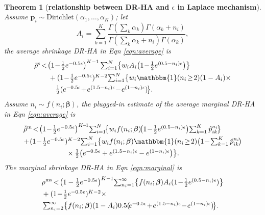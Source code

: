 \documentclass[10pt,journal,compsoc]{IEEEtran}
\newtheorem{thm}{\vspace{-6pt}\\ Theorem}
\newcommand{\p}{\mathbf{p}}
\newcommand{\bs}{\boldsymbol}
\begin{document}
\begin{thm}[\textbf{relationship between DR-HA and $\epsilon$ in Laplace mechanism}]
Assume $\p_i\!\sim\!\mbox{Dirichlet}(\alpha_1,\ldots,\alpha_K)$; let $$\mbox{$A_i=\sum_{k=1}^{K}\frac{\Gamma(\sum_k\alpha_k)\Gamma(\alpha_{k}+n_i)}{\Gamma(\sum_k\alpha_k+n_i)\Gamma(\alpha_{k})}$},$$ 
the average shrinkage DR-HA  in Eqn \eqref{eqn:average} is
\begin{align}
&\textstyle \bar{\rho}^{\text{s}}\!<\!\left(1\!-\!\frac{1}{2}e^{-0.5\epsilon}\right)^{K-1}\sum_{i=1}^{N}\!\big\{w_iA_i\big(1\!-\!\frac{1}{2}e^{(0.5-n_i)\epsilon}\big)\big\}\notag\\
&\qquad\textstyle + (1\!-\!\frac{1}{2}e^{-0.5\epsilon})^{K-2}\!\sum_{i=1}^{N}\!\big\{w_i\mathbbm{1}(n_i\!\ge\!2)(1-A_i)\times\label{eqn:averages.lap.K} \\
&\qquad\quad\textstyle\frac{1}{2}(e^{-0.5\epsilon}\!+\!e^{(1.5-n_i)\epsilon}\!-\!e^{(1-n_i)\epsilon})\!\big\}.  \notag
\end{align}
Assume $n_i\sim f(n_i;\bs{\beta})$, the plugged-in estimate of the average marginal DR-HA  in Eqn  \eqref{eqn:average} is
\begin{align}
&\textstyle\bar{\hat{\rho}}^{\text{m}}\!<\!\big(1\!-\!\frac{1}{2}e^{-0.5\epsilon}\big)^{K\!-\!1}\!\sum_{i=1}^N\!\!\big\{w_if(n_i;\bs\beta)\!\big(1\!-\!\frac{1}{2}e^{(0.5-n_i)\epsilon}\big)\!\sum_{k=1}^{K}\hat{p}_{ik}^{n_i}\!\big\}\notag\\
&\!+\!\textstyle(1\!-\!\frac{1}{2}e^{-0.5\epsilon})^{K-2}\!\sum_{i=1}^N\!\big\{w_if(n_i;\bs\beta) \mathbbm{1}(n_i\!\ge\!2)\big(1\!-\!\sum_{k=1}^{K}\hat{p}_{ik}^{n_i}\!\big)
\notag\\
&\qquad\qquad\qquad\textstyle\times\frac{1}{2}\big(e^{-0.5\epsilon}+e^{(1.5-n_i)\epsilon}-e^{(1-n_i)\epsilon}\big)\big\}.\label{eqn:averagem.lap.K} 
\end{align}
\normalsize The marginal shrinkage DR-HA in Eqn \eqref{eqn:marginal} is
\begin{align}
&\rho^{\text{ms}}\!<\!\textstyle\big(1-\frac{1}{2}e^{-0.5\epsilon}\big)^{K-1}\!\sum_{n_i=1}^{\infty}\!\big\{f(n_i;\bs\beta)A_i(1\!-\!\frac{1}{2}e^{(0.5-n_i)\epsilon})\big\}\notag\\
&+\textstyle(1\!-\!\frac{1}{2}e^{-0.5\epsilon})^{K-2} \times\label{eqn:averagems.lap.K}\\
&\textstyle\sum_{n_i=2}^{\infty}\!\big\{f(n_i;\bs\beta)(1-A_i)0.5(\!e^{-0.5\epsilon}\!+\!e^{(1.5-n_i)\epsilon}\!-\!e^{(1-n_i)\epsilon})\!\big\}.\notag
\end{align}
\end{thm}
\end{document}
